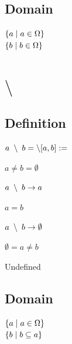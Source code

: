 \documentclass[11pt]{article}
\begin{document}
\subsection{Domain}
\begin{center}
$
\{ a \hspace{1mm} | \hspace{1mm} a \in \Omega\}
$
\\ \vspace{2mm}
$
\{ b \hspace{1mm}|\hspace{1mm} b \in \Omega\}
$
\end{center}






\newpage
\section{$\setminus$}
\subsection{Definition}
\vspace{1mm}
\begin{center}
$
a \hspace{1mm} \setminus \hspace{1mm}  b = \setminus[a,b] := 
$
\end{center}
$a \neq b = \emptyset$
\begin{center}
$
a \hspace{1mm} \setminus \hspace{1mm} b \rightarrow a
$
\end{center}
\vspace{2mm}
$a = b$
\begin{center}
$
a \hspace{1mm} \setminus \hspace{1mm} b \rightarrow \emptyset
$
\end{center}
\vspace{2mm}
$\emptyset = a \neq b$
\begin{center}
Undefined
\end{center}
\subsection{Domain}
\begin{center}
$
\{ a \hspace{1mm} | \hspace{1mm} a \in \Omega\}
$
\\ \vspace{2mm}
$
\{ b \hspace{1mm}|\hspace{1mm} b \subseteq a\}
$
\end{center}
\end{document}
